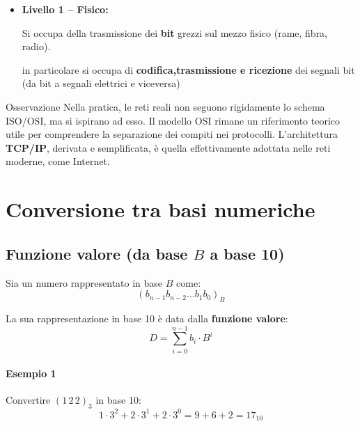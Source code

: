 \documentclass[a4paper,12pt]{report}
\begin{document}
\begin{itemize}
\begin{itemize}
            Per capire se ci sono errori viene attivato un timer che farà rinviare il frame in caso non ricevesse Acknoledgment.
            \end{itemize}
             
        \textit{Esempi di tecnologie:} Ethernet, Wi-Fi.  
        \textit{Dispositivi tipici:} switch,bridge schede di rete (NIC).
    
        \item \textbf{Livello 1 – Fisico:} 
        
        Si occupa della trasmissione dei \textbf{bit} grezzi sul mezzo fisico (rame, fibra, radio).  
    
        in particolare si occupa di \textbf{codifica,trasmissione e ricezione} dei segnali bit (da bit a segnali elettrici e viceversa)
\end{itemize}


\begin{notebox}{Osservazione}
Nella pratica, le reti reali non seguono rigidamente lo schema ISO/OSI, ma si ispirano ad esso.  
Il modello OSI rimane un riferimento teorico utile per comprendere la separazione dei compiti nei protocolli.  
L’architettura \textbf{TCP/IP}, derivata e semplificata, è quella effettivamente adottata nelle reti moderne, come Internet.
\end{notebox}














\chapter{Conversione tra basi numeriche}

\section{Funzione valore (da base \(B\) a base 10)}

Sia un numero rappresentato in base \(B\) come:
\[
(b_{n-1} b_{n-2} \ldots b_1 b_0)_B
\]

La sua rappresentazione in base 10 è data dalla \textbf{funzione valore}:
\[
D = \sum_{i=0}^{n-1} b_i \cdot B^i
\]

\subsubsection*{Esempio 1}
Convertire \( (1\,2\,2)_3 \) in base 10:
\[
1 \cdot 3^2 + 2 \cdot 3^1 + 2 \cdot 3^0 = 9 + 6 + 2 = \boxed{17_{10}}
\]
\end{document}
